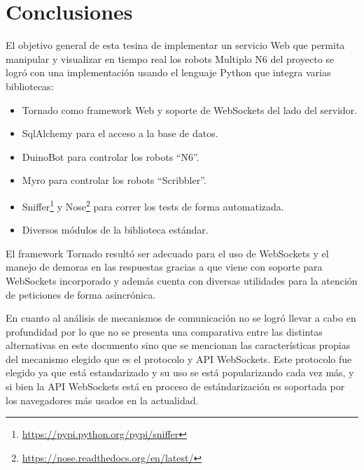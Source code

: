 
\chapter{Conclusiones}\label{cha:conclusiones}

%


El objetivo general de esta tesina de implementar un servicio Web que permita
manipular y visualizar en tiempo real los robots Multiplo N6 del proyecto
\proyecto{} se logró con una implementación usando el lenguaje Python
que integra varias bibliotecas:

\begin{itemize}
    \item Tornado como framework Web y soporte de WebSockets del lado del
    servidor.
    \item SqlAlchemy para el acceso a la base de datos.
    \item DuinoBot para controlar los robots ``N6''.
    \item Myro para controlar los robots ``Scribbler''.
    \item Sniffer\footnote{\url{https://pypi.python.org/pypi/sniffer}} y
    Nose\footnote{\url{https://nose.readthedocs.org/en/latest/}} para correr
    los tests de forma automatizada.
    \item Diversos módulos de la biblioteca estándar.
\end{itemize}

El framework Tornado resultó ser adecuado para el uso de WebSockets y el manejo
de demoras en las respuestas gracias a que viene con soporte para WebSockets
incorporado y además cuenta con diversas utilidades para la atención de peticiones
de forma asincrónica.

En cuanto al análisis de mecanismos de comunicación no se logró llevar a cabo
en profundidad por lo que no se presenta una comparativa entre las distintas
alternativas en este documento sino que se mencionan las características propias
del mecanismo elegido que es el protocolo y API WebSockets. Este protocolo fue
elegido ya que está estandarizado y su uso se está popularizando cada vez más,
y si bien la API WebSockets está en proceso de estándarización es soportada
por los navegadores más usados en la actualidad.

